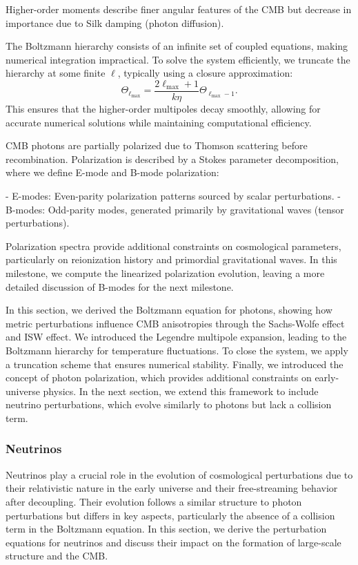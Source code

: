 \documentclass{aa}
\begin{document}
Higher-order moments describe finer angular features of the CMB but decrease in importance due to Silk damping (photon diffusion).

The Boltzmann hierarchy consists of an infinite set of coupled equations, making numerical integration impractical. To solve the system efficiently, we truncate the hierarchy at some finite $\ell$, typically using a closure approximation:
\begin{equation}
\Theta_{\ell_{\max}} = \frac{2\ell_{\max} + 1}{k \eta} \Theta_{\ell_{\max} - 1}.
\end{equation}
This ensures that the higher-order multipoles decay smoothly, allowing for accurate numerical solutions while maintaining computational efficiency.

CMB photons are partially polarized due to Thomson scattering before recombination. Polarization is described by a Stokes parameter decomposition, where we define E-mode and B-mode polarization:

- E-modes: Even-parity polarization patterns sourced by scalar perturbations.
- B-modes: Odd-parity modes, generated primarily by gravitational waves (tensor perturbations).

Polarization spectra provide additional constraints on cosmological parameters, particularly on reionization history and primordial gravitational waves. In this milestone, we compute the linearized polarization evolution, leaving a more detailed discussion of B-modes for the next milestone.

In this section, we derived the Boltzmann equation for photons, showing how metric perturbations influence CMB anisotropies through the Sachs-Wolfe effect and ISW effect. We introduced the Legendre multipole expansion, leading to the Boltzmann hierarchy for temperature fluctuations. To close the system, we apply a truncation scheme that ensures numerical stability. Finally, we introduced the concept of photon polarization, which provides additional constraints on early-universe physics. In the next section, we extend this framework to include neutrino perturbations, which evolve similarly to photons but lack a collision term.
\color{black}







\subsubsection{Neutrinos}
\color{Plum}
Neutrinos play a crucial role in the evolution of cosmological perturbations due to their relativistic nature in the early universe and their free-streaming behavior after decoupling. Their evolution follows a similar structure to photon perturbations but differs in key aspects, particularly the absence of a collision term in the Boltzmann equation. In this section, we derive the perturbation equations for neutrinos and discuss their impact on the formation of large-scale structure and the CMB. 
\end{document}
